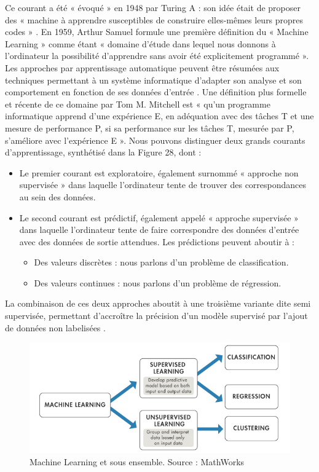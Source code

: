 Ce courant a été « évoqué » en 1948 par Turing A : son idée était de proposer des « machine à apprendre susceptibles de construire elles-mêmes leurs propres codes » \cite{Turing1950}. En 1959, Arthur Samuel  formule une première définition du « Machine Learning » comme étant « domaine d’étude dans lequel nous donnons à l’ordinateur la possibilité d’apprendre sans avoir été explicitement programmé ». Les approches par apprentissage automatique peuvent être résumées aux techniques permettant à un système informatique d’adapter son analyse et son comportement en fonction de ses données d’entrée  . Une définition plus formelle et récente de ce domaine par Tom M. Mitchell  est « qu’un programme informatique apprend d’une expérience E, en adéquation avec des tâches T et une mesure de performance P, si sa performance sur les tâches T, mesurée par P, s’améliore avec l’expérience E ».
Nous pouvons distinguer deux grands courants d’apprentissage, synthétisé dans la Figure 28, dont : 
\begin{itemize}
    \item Le premier courant est exploratoire, également surnommé « approche non supervisée » dans laquelle l’ordinateur tente de trouver des correspondances au sein des données.
    \item Le second courant est prédictif, également appelé « approche supervisée » dans laquelle l’ordinateur tente de faire correspondre des données d’entrée avec des données de sortie attendues. Les prédictions peuvent aboutir à :
    \begin{itemize}
	    \item Des valeurs discrètes : nous parlons d’un problème de classification.
	    \item Des valeurs continues : nous parlons d’un problème de régression.
	\end{itemize}
\end{itemize}

La combinaison de ces deux approches aboutit à une troisième variante dite semi supervisée, permettant d’accroître la précision d’un modèle supervisé par l’ajout de données non labelisées \cite{Murphy2012}.
 
 \begin{figure}[H]
    \centering
    \includegraphics[width=\linewidth]{contents/chapter_3/resources/machine_learning.png}
    \caption{Machine Learning et sous ensemble. Source : MathWorks}
    \label{fig:machine_learning_categories}
\end{figure}


